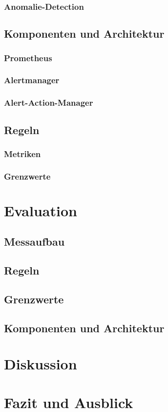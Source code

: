 \documentclass[a4paper,12pt]{scrartcl}
\begin{document}
\subsubsection{Anomalie-Detection}
\subsection{Komponenten und Architektur}
\subsubsection{Prometheus}
\subsubsection{Alertmanager}
\subsubsection{Alert-Action-Manager}
\subsection{Regeln}
\subsubsection{Metriken}
\subsubsection{Grenzwerte}

\section{Evaluation}
\subsection{Messaufbau}
\subsection{Regeln}
\subsection{Grenzwerte}
\subsection{Komponenten und Architektur}

\section{Diskussion}
\section{Fazit und Ausblick}

\newpage

\end{document}
